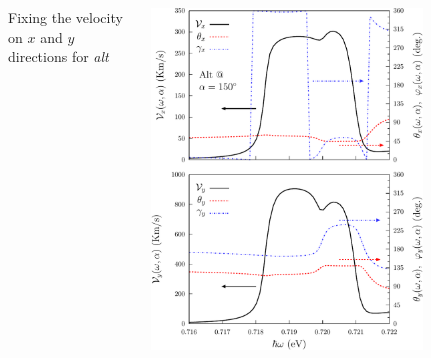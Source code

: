 \documentclass{beamer}
\begin{document}


\begin{frame}

\begin{columns}


\vspace{-3mm}

{\small Fixing the velocity on $x$ and $y$ directions for \emph{alt}}

\vspace{2mm}

\begin{center}

\vspace{-6mm}

\includegraphics[width=0.80\textwidth]{figs/fig9.pdf}

\end{center}  


{\small

\vspace{-2mm}
\begin{itemize}


\end{itemize}}
\end{columns}
\end{frame}
\end{document}
